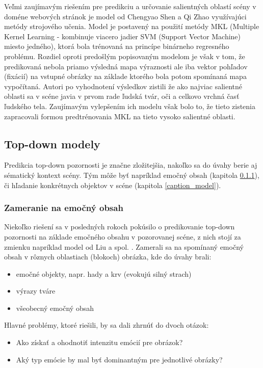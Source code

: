 Veľmi zaujímavým riešením pre predikciu a určovanie salientných oblastí scény v doméne webových stránok je model od Chengyao Shen a Qi Zhao\cite{Saliency} využívajúci metódy strojového učenia. Model je postavený na použití metódy MKL (Multiple Kernel Learning - kombinuje viacero jadier SVM (Support Vector Machine) miesto jedného), ktorá bola 
trénovaná na princípe binárneho regresného problému. Rozdiel oproti predošlým popisovaným modelom je však v tom, že predikovaná nebola priamo výsledná mapa výraznosti ale iba vektor pohľadov (fixácií) na vstupné obrázky na základe ktorého bola potom spomínaná mapa vypočítaná. Autori po vyhodnotení výsledkov zistili že ako najviac salientné oblasti sa v scéne javia v prvom rade ľudská tvár, oči a celkovo vrchná časť ľudského tela. Zaujímavým vylepšením ich modelu však bolo to, že tieto zistenia zapracovali formou predtrénovania MKL na tieto vysoko salientné oblasti. 


\subsection{Top-down modely}
\label{top-down_modely}
Predikcia top-down pozornosti je značne zložitejšia, nakoľko sa do úvahy berie aj sématický kontext scény. Tým môže byť napríklad emočný obsah (kapitola \ref{emotion_content}), či hľadanie konkrétnych objektov v scéne (kapitola \ref{caption_model}).


\subsubsection{Zameranie na emočný obsah}
\label{emotion_content}
Niekoľko riešení sa v posledných rokoch pokúsilo o predikovanie top-down pozornosti na základe emočného obsahu v pozorovanej scéne, z nich stojí za zmienku napríklad model od Liu a spol. \cite{liu2016improving}. Zamerali sa na spomínaný emočný obsah v rôznych oblastiach (blokoch) obrázka, kde do úvahy brali:
\begin{itemize}
	\item emočné objekty, napr. hady a krv (evokujú silný strach)
	\item výrazy tváre
	\item všeobecný emočný obsah
\end{itemize}

Hlavné problémy, ktoré riešili, by sa dali zhrnúť do dvoch otázok:
\begin{itemize}
	\item Ako získať a ohodnotiť intenzitu emócií pre obrázok?
	\item Aký typ emócie by mal byť dominantným pre jednotlivé obrázky?
\end{itemize}

